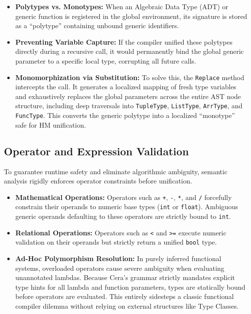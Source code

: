 \documentclass[11pt, a4paper]{article}
\begin{document}
\begin{itemize}
    \item \textbf{Polytypes vs. Monotypes:} When an Algebraic Data Type (ADT) or generic function is registered in the global environment, its signature is stored as a ``polytype'' containing unbound generic identifiers.
    \item \textbf{Preventing Variable Capture:} If the compiler unified these polytypes directly during a recursive call, it would permanently bind the global generic parameter to a specific local type, corrupting all future calls.
    \item \textbf{Monomorphization via Substitution:} To solve this, the \texttt{Replace} method intercepts the call. It generates a localized mapping of fresh type variables and exhaustively replaces the global parameters across the entire AST node structure, including deep traversals into \texttt{TupleType}, \texttt{ListType}, \texttt{ArrType}, and \texttt{FuncType}. This converts the generic polytype into a localized ``monotype'' safe for HM unification.
\end{itemize}

\subsection{Operator and Expression Validation}
To guarantee runtime safety and eliminate algorithmic ambiguity, semantic analysis rigidly enforces operator constraints before unification.
\begin{itemize}
    \item \textbf{Mathematical Operations:} Operators such as \texttt{+}, \texttt{-}, \texttt{*}, and \texttt{/} forcefully constrain their operands to numeric base types (\texttt{int} or \texttt{float}). Ambiguous generic operands defaulting to these operators are strictly bound to \texttt{int}.
    \item \textbf{Relational Operations:} Operators such as \texttt{<} and \texttt{>=} execute numeric validation on their operands but strictly return a unified \texttt{bool} type. 
    \item \textbf{Ad-Hoc Polymorphism Resolution:} In purely inferred functional systems, overloaded operators cause severe ambiguity when evaluating unannotated lambdas. Because Cera's grammar strictly mandates explicit type hints for all lambda and function parameters, types are statically bound before operators are evaluated. This entirely sidesteps a classic functional compiler dilemma without relying on external structures like Type Classes.
\end{itemize}
\end{document}
